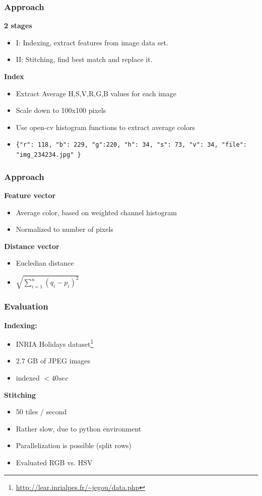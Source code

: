 \documentclass[11pt]{beamer}
\begin{document}
\begin{frame}
\frametitle{Approach}
\textbf{2 stages}
\begin{itemize}
	\item I: Indexing, extract features from image data set.
	\item II: Stitching, find best match and replace it.
\end{itemize}

\textbf{Index}
\begin{itemize}
	\item Extract Average H,S,V,R,G,B values for each image
	\item Scale down to 100x100 pixels
	\item Use open-cv histogram functions to extract average colors
	\item \texttt{\{"r": 118, "b": 229, "g":220, "h": 34, "s": 73, "v": 34, "file": "img\_234234.jpg" \}}
\end{itemize}
\end{frame}

\begin{frame}
\frametitle{Approach}
\textbf{Feature vector}
\begin{itemize}
	\item Average color, based on weighted channel histogram
	\item Normalized to number of pixels
\end{itemize}
\textbf{Distance vector}
\begin{itemize}
	\item Eucledian distance
	\item $\sqrt{\sum_{i=1}^n (q_i-p_i)^2}$
\end{itemize}
\end{frame}

\begin{frame}
\frametitle{Evaluation}
\textbf{Indexing:}
\begin{itemize}
	\item INRIA Holidays dataset\footnote{\url{http://lear.inrialpes.fr/~jegou/data.php}}
	\item 2.7 GB of JPEG images
	\item indexed $< 40 sec$
\end{itemize}
\textbf{Stitching}
\begin{itemize}
	\item 50 tiles / second
	\item Rather slow, due to python environment
	\item Parallelization is possible (split rows)
	\item Evaluated RGB vs. HSV
\end{itemize}
\end{frame}
\end{document}
